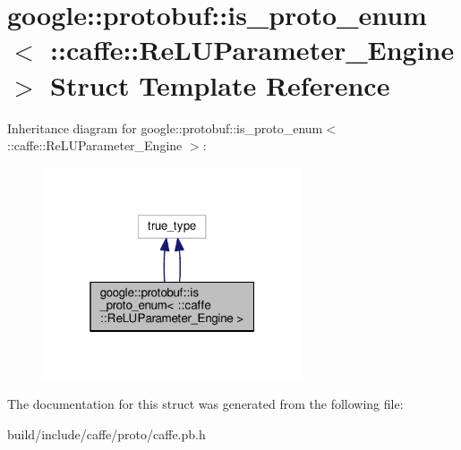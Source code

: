 \hypertarget{structgoogle_1_1protobuf_1_1is__proto__enum_3_01_1_1caffe_1_1_re_l_u_parameter___engine_01_4}{}\section{google\+:\+:protobuf\+:\+:is\+\_\+proto\+\_\+enum$<$ \+:\+:caffe\+:\+:Re\+L\+U\+Parameter\+\_\+\+Engine $>$ Struct Template Reference}
\label{structgoogle_1_1protobuf_1_1is__proto__enum_3_01_1_1caffe_1_1_re_l_u_parameter___engine_01_4}


Inheritance diagram for google\+:\+:protobuf\+:\+:is\+\_\+proto\+\_\+enum$<$ \+:\+:caffe\+:\+:Re\+L\+U\+Parameter\+\_\+\+Engine $>$\+:
\nopagebreak
\begin{figure}[H]
\begin{center}
\leavevmode
\includegraphics[width=217pt]{structgoogle_1_1protobuf_1_1is__proto__enum_3_01_1_1caffe_1_1_re_l_u_parameter___engine_01_4__inherit__graph}
\end{center}
\end{figure}


The documentation for this struct was generated from the following file\+:\begin{DoxyCompactItemize}
\item 
build/include/caffe/proto/caffe.\+pb.\+h\end{DoxyCompactItemize}
